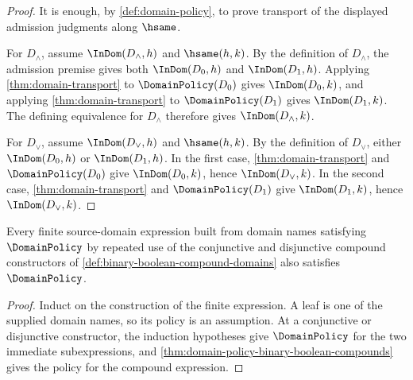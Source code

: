 \begin{proof}
It is enough, by \autoref{def:domain-policy}, to prove transport of the displayed admission judgments along $\hsame$.

For $D_{\wedge}$, assume $\InDom(D_{\wedge},h)$ and $\hsame(h,k)$. By the definition of $D_{\wedge}$, the admission premise gives both $\InDom(D_0,h)$ and $\InDom(D_1,h)$. Applying \autoref{thm:domain-transport} to $\DomainPolicy(D_0)$ gives $\InDom(D_0,k)$, and applying \autoref{thm:domain-transport} to $\DomainPolicy(D_1)$ gives $\InDom(D_1,k)$. The defining equivalence for $D_{\wedge}$ therefore gives $\InDom(D_{\wedge},k)$.

For $D_{\vee}$, assume $\InDom(D_{\vee},h)$ and $\hsame(h,k)$. By the definition of $D_{\vee}$, either $\InDom(D_0,h)$ or $\InDom(D_1,h)$. In the first case, \autoref{thm:domain-transport} and $\DomainPolicy(D_0)$ give $\InDom(D_0,k)$, hence $\InDom(D_{\vee},k)$. In the second case, \autoref{thm:domain-transport} and $\DomainPolicy(D_1)$ give $\InDom(D_1,k)$, hence $\InDom(D_{\vee},k)$.
\end{proof}

\begin{corollary}
\label{cor:domain-policy-finite-boolean-expressions}
Every finite source-domain expression built from domain names satisfying $\DomainPolicy$ by repeated use of the conjunctive and disjunctive compound constructors of \autoref{def:binary-boolean-compound-domains} also satisfies $\DomainPolicy$.
\end{corollary}

\begin{proof}
Induct on the construction of the finite expression. A leaf is one of the supplied domain names, so its policy is an assumption. At a conjunctive or disjunctive constructor, the induction hypotheses give $\DomainPolicy$ for the two immediate subexpressions, and \autoref{thm:domain-policy-binary-boolean-compounds} gives the policy for the compound expression.
\end{proof}
